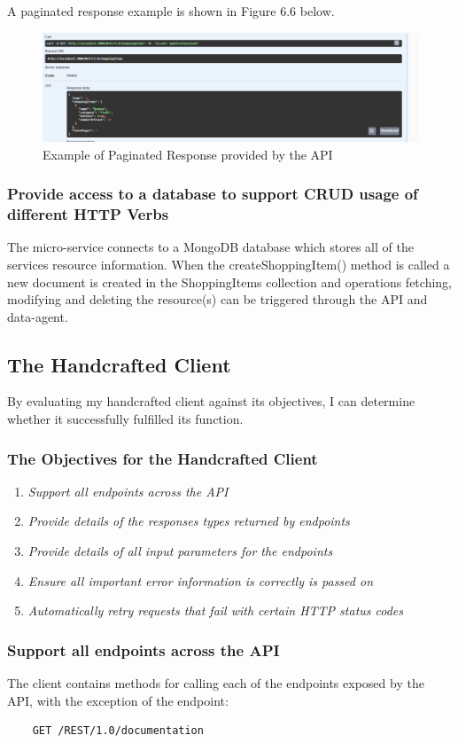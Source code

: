 A paginated response example is shown in Figure 6.6 below.
\begin{figure}[!htb]
    \caption{Example of Paginated Response provided by the API}
\centering
\includegraphics[scale=0.4]{FYP_Dissertation_template/Figures/pagination-example.PNG}
\end{figure}
\FloatBarrier
\subsubsection{Provide access to a database to support CRUD usage of different HTTP Verbs}
The micro-service connects to a MongoDB database which stores all of the services resource information. When the createShoppingItem() method is called a new document is created in the ShoppingItems collection and operations fetching, modifying and deleting the resource(s) can be triggered through the API and data-agent.
\subsection{The Handcrafted Client}
By evaluating my handcrafted client against its objectives, I can determine whether it successfully fulfilled its function.
\subsubsection{The Objectives for the Handcrafted Client}
\begin{enumerate}
    \item \textit{Support all endpoints across the API}
    \item \textit{Provide details of the responses types returned by endpoints}
    \item \textit{Provide details of all input parameters for the endpoints}
    \item \textit{Ensure all important error information is correctly is passed on}
    \item \textit{Automatically retry requests that fail with certain HTTP status codes}
\end{enumerate}
\subsubsection{Support all endpoints across the API}
The client contains methods for calling each of the endpoints exposed by the API, with the exception of the endpoint:
\begin{verbatim}
    GET /REST/1.0/documentation
\end{verbatim}

